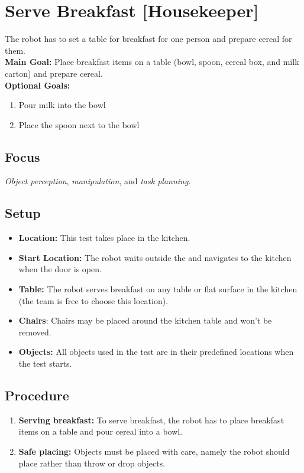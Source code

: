 \section{Serve Breakfast [Housekeeper]}
\label{test:serve-breakfast}
The robot has to set a table for breakfast for one person and prepare cereal for them.\\

\noindent \textbf{Main Goal:} Place breakfast items on a table (bowl, spoon, cereal box, and milk carton) and prepare cereal.\\

\noindent \textbf{Optional Goals:}
\begin{enumerate}[nosep]
	\item Pour milk into the bowl
	\item Place the spoon next to the bowl
\end{enumerate}

\subsection*{Focus}
\emph{Object perception}, \emph{manipulation}, and \emph{task planning}.

\subsection*{Setup}
\begin{itemize}[nosep]
	\item \textbf{Location:} This test takes place in the kitchen.
	\item \textbf{Start Location:} The robot waits outside the \Arena{} and navigates to the kitchen when the door is open.
	\item \textbf{Table:} The robot serves breakfast on any table or flat surface in the kitchen (the team is free to choose this location).
	\item \textbf{Chairs}: Chairs may be placed around the kitchen table and won't be removed.
	\item \textbf{Objects:} All objects used in the test are in their predefined locations when the test starts.
\end{itemize}

\subsection*{Procedure}
\begin{enumerate}[nosep]
	\item \textbf{Serving breakfast:} To serve breakfast, the robot has to place breakfast items on a table and pour cereal into a bowl.
	\item \textbf{Safe placing:} Objects must be placed with care, namely the robot should place rather than throw or drop objects.
\end{enumerate}

